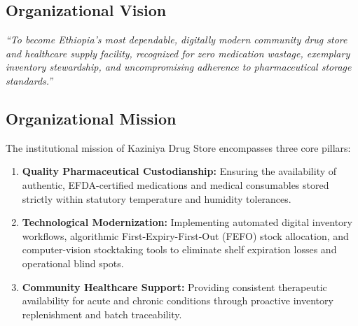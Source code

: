 \subsection{Organizational Vision}
\textit{“To become Ethiopia’s most dependable, digitally modern community drug store and healthcare supply facility, recognized for zero medication wastage, exemplary inventory stewardship, and uncompromising adherence to pharmaceutical storage standards.”}

\subsection{Organizational Mission}
The institutional mission of Kaziniya Drug Store encompasses three core pillars:
\begin{enumerate}
    \item \textbf{Quality Pharmaceutical Custodianship:} Ensuring the availability of authentic, EFDA-certified medications and medical consumables stored strictly within statutory temperature and humidity tolerances.
    \item \textbf{Technological Modernization:} Implementing automated digital inventory workflows, algorithmic First-Expiry-First-Out (FEFO) stock allocation, and computer-vision stocktaking tools to eliminate shelf expiration losses and operational blind spots.
    \item \textbf{Community Healthcare Support:} Providing consistent therapeutic availability for acute and chronic conditions through proactive inventory replenishment and batch traceability.
\end{enumerate}

